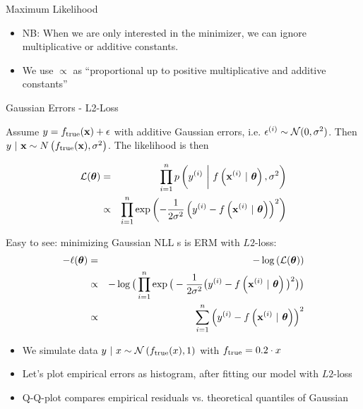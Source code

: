 \documentclass[11pt,compress,t,notes=noshow, xcolor=table]{beamer}
\begin{document}
\begin{vbframe}{Maximum Likelihood}
\begin{itemize}
\item NB: When we are only interested in the minimizer, we can ignore multiplicative or additive constants.
\item We use $\propto$ as \enquote{proportional up to positive multiplicative and additive constants}

\end{itemize}

\end{vbframe}


\begin{vbframe}{Gaussian Errors - L2-Loss} 

Assume $y = f_{\text{true}}(\mathbf{x}) + \epsilon$ with additive Gaussian errors, i.e. $\epsilon^{(i)} \sim \mathcal{N}(0, \sigma^2)$. Then $y~|~\mathbf{x} \sim N\left(f_{\text{true}}(\mathbf{x}), \sigma^2\right)$. The likelihood is then 

{\small
\begin{eqnarray*}
\mathcal{L}(\bm{\theta}) &=& \prod\limits_{i=1}^n p\left(y^{(i)} ~\bigg|~ f\left(\mathbf{x}^{(i)} ~|~ \bm{\theta}\right), \sigma^2\right) \\ &\propto& \prod\limits_{i=1}^n \exp\left(-\frac{1}{2\sigma^2} \left(y^{(i)} - f\left(\mathbf{x}^{(i)} ~|~ \bm{\theta}\right)\right)^2\right)
\end{eqnarray*}
}


Easy to see: minimizing Gaussian NLL s is ERM with $L2$-loss:
{\small
\begin{eqnarray*}
- \ell(\bm{\theta}) &=& - \log\left(\mathcal{L}(\bm{\theta})\right) \\
&\propto& - \log\big(\prod\limits_{i=1}^n \exp\big(-\frac{1}{2\sigma^2} \big(y^{(i)} - f\left(\mathbf{x}^{(i)} ~|~ \bm{\theta}\right)\big)^2\big)\big) \\
&\propto& \sum\limits_{i=1}^n \left(y^{(i)} - f\left(\mathbf{x}^{(i)} ~|~ \bm{\theta}\right)\right)^2
\end{eqnarray*}
}

\framebreak 

\begin{footnotesize}
\begin{itemize}
	\item We simulate data $y ~|~x \sim \mathcal{N}\left(f_{\text{true}}(x), 1\right)$ with $f_{\text{true}} = 0.2 \cdot x$ 
\item Let's plot empirical errors as histogram, after fitting our model with $L2$-loss
\item Q-Q-plot compares empirical residuals vs. theoretical quantiles of Gaussian 
\end{itemize}
\end{footnotesize}


\end{vbframe}
\end{document}
